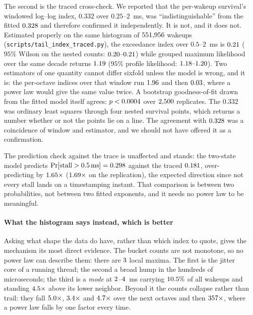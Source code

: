 \documentclass[10pt,journal,onecolumn]{IEEEtran}
\begin{document}
The second is the traced cross-check. We reported that the per-wakeup survival's windowed
log--log index, $0.332$ over $0.25$--$2$~ms, was ``indistinguishable'' from the fitted
$0.328$ and therefore confirmed it independently. It is not, and it does not.
Estimated properly on the same histogram of $551{,}956$ wakeups
(\texttt{scripts/tail\_index\_traced.py}), the exceedance index over $0.5$--$2$~ms is
$0.21$ ($95\%$ Wilson on the nested counts: $\tracedExcCI$) while grouped
maximum likelihood over the same decade returns $1.19$ ($95\%$ profile likelihood:
$\tracedMleCI$). Two estimators of one quantity cannot differ sixfold unless the model is
wrong, and it is: the per-octave indices over that window run $1.96$ and then
$0.03$, where a power law would give the same value twice. A bootstrap
goodness-of-fit drawn from the fitted model itself agrees: $p <0.0004$ over
$2{,}500$ replicates. The $0.332$ was
ordinary least squares through four nested survival points, which returns a number whether
or not the points lie on a line. The agreement with $0.328$ was a coincidence of
window and estimator, and we should not have offered it as a confirmation.

The prediction check against the trace is unaffected and stands: the two-state model predicts
$\Pr[\text{stall} > 0.5\,\text{ms}] = 0.298$ against the traced $0.181$, over-predicting by
$1.65\times$ ($1.69\times$ on the replication), the expected direction since not every
stall lands on a timestamping instant. That comparison is between two probabilities, not
between two fitted exponents, and it needs no power law to be meaningful.

\paragraph{What the histogram says instead, which is better} Asking what shape the data
do have, rather than which index to quote, gives the mechanism its most direct evidence.
The bucket counts are not monotone, so no power law can describe them: there are
$3$ local maxima. The first is the jitter core of a running thread; the second a
broad hump in the hundreds of microseconds; the third is a \emph{mode} at
$2$--$4$~ms carrying $10.5\%$ of all wakeups and
standing $4.5\times$ above its lower neighbor. Beyond it the counts collapse
rather than trail: they fall $5.0\times$, $3.4\times$ and $4.7\times$ over the
next \tracedModeFallOctaves{} octaves and then $357\times$, where a power law
falls by one factor every time.
\end{document}
